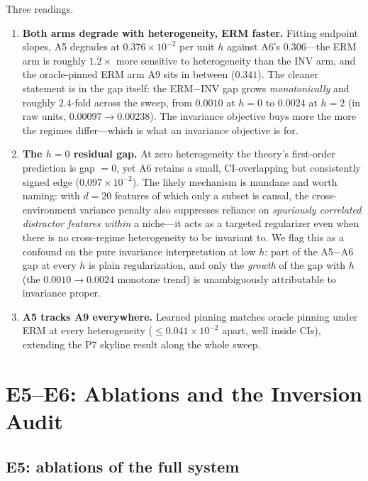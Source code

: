 \documentclass[11pt,a4paper]{article}
\theoremstyle{definition}
\theoremstyle{plain}
\begin{document}
Three readings.

\begin{enumerate}
\item \textbf{Both arms degrade with heterogeneity, ERM faster.} Fitting
endpoint slopes, A5 degrades at $0.376 \times 10^{-2}$ per unit $h$ against
A6's $0.306$---the ERM arm is roughly $1.2\times$ more sensitive to
heterogeneity than the INV arm, and the oracle-pinned ERM arm A9 sits in
between ($0.341$). The cleaner statement is in the gap itself: the
ERM$-$INV gap grows \emph{monotonically} and roughly $2.4$-fold across the
sweep, from $0.0010$ at $h = 0$ to $0.0024$ at $h = 2$
(in raw units, $0.00097 \to 0.00238$). The invariance objective buys more
the more the regimes differ---which is what an invariance objective is for.
\item \textbf{The $h = 0$ residual gap.} At zero heterogeneity the theory's
first-order prediction is gap $= 0$, yet A6 retains a small, CI-overlapping
but consistently signed edge ($0.097 \times 10^{-2}$). The likely mechanism
is mundane and worth naming: with $d = 20$ features of which only a subset
is causal, the cross-environment variance penalty also suppresses reliance
on \emph{spuriously correlated distractor features within} a niche---it
acts as a targeted regularizer even when there is no cross-regime
heterogeneity to be invariant to. We flag this as a confound on the pure
invariance interpretation at low $h$: part of the A5$-$A6 gap at every $h$
is plain regularization, and only the \emph{growth} of the gap with $h$
(the $0.0010 \to 0.0024$ monotone trend) is unambiguously attributable to
invariance proper.
\item \textbf{A5 tracks A9 everywhere.} Learned pinning matches
oracle pinning under ERM at every heterogeneity ($\le 0.041 \times 10^{-2}$
apart, well inside CIs), extending the P7 skyline result along the whole
sweep.
\end{enumerate}

\section{E5--E6: Ablations and the Inversion Audit}
\label{sec:dd5-e5e6}

\subsection{E5: ablations of the full system}
\label{sec:dd5-e5}
\end{document}
